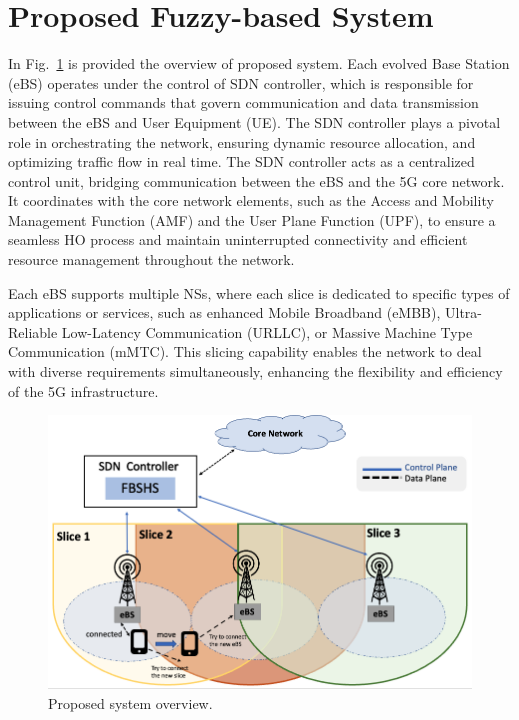 \documentclass[graybox]{svmult}
\begin{document}
\section{Proposed Fuzzy-based System}\label{sec:proposed}

In Fig.~\ref{fig:5GHO} is provided the overview of proposed system. Each evolved Base Station (eBS) operates under the control of SDN controller, which is responsible for issuing control commands that govern communication and data transmission between the eBS and User Equipment (UE). The SDN controller plays a pivotal role in orchestrating the network, ensuring dynamic resource allocation, and optimizing traffic flow in real time. The SDN controller acts as a centralized control unit, bridging communication between the eBS and the 5G core network. It coordinates with the core network elements, such as the Access and Mobility Management Function (AMF) and the User Plane Function (UPF), to ensure a seamless HO process and maintain uninterrupted connectivity and efficient resource management throughout the network.

Each eBS supports multiple NSs, where each slice is dedicated to specific types of applications or services, such as enhanced Mobile Broadband (eMBB), Ultra-Reliable Low-Latency Communication (URLLC), or Massive Machine Type Communication (mMTC). This slicing capability enables the network to deal with diverse requirements simultaneously, enhancing the flexibility and efficiency of the 5G infrastructure.

\begin{figure}[h]\centering
	\includegraphics[width=1\textwidth]{figure/5GHO.png}
	\caption{Proposed system overview.}\label{fig:5GHO}
\end{figure}
\end{document}

